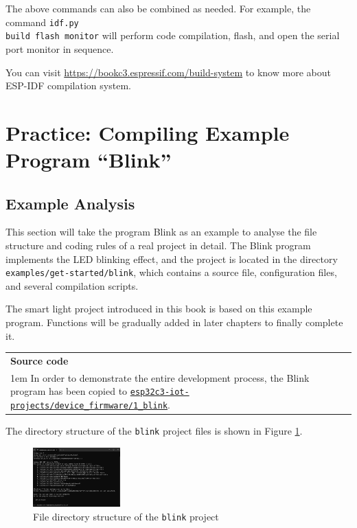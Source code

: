 \documentclass[a4paper,12pt,openany]{book}
\newcommand{\note}[2][NOTE]{ %
\vspace{6pt}
\begin{tabular}{b{\textwidth}}
\hline
\fontfamily{phv}\selectfont \textbf{#1}\\
\leftskip 1em #2\\
\hline
\end{tabular}
}
\begin{document}
The above commands can also be combined as needed. For example, the command \verb|idf.py |\\ \verb|build flash monitor| will perform code compilation, flash, and open the serial port monitor in sequence.

You can visit \url{https://bookc3.espressif.com/build-system} to know more about ESP-IDF compilation system.

\section{Practice: Compiling Example Program “Blink”}
\subsection{Example Analysis}
This section will take the program Blink as an example to analyse the file structure and coding rules of a real project in detail. The Blink program implements the LED blinking effect, and the project is located in the directory \verb|examples/get-started/blink|, which contains a source file, configuration files, and several compilation scripts.

The smart light project introduced in this book is based on this example program. Functions will be gradually added in later chapters to finally complete it.

\note[Source code]{In order to demonstrate the entire development process, the Blink program has been copied to \href{https://github.com/espressif/book-esp32c3-iot-projects/tree/main/device_firmware/1_blink}{\texttt{esp32c3-iot-projects/device\_firmware/1\_blink}}.}

The directory structure of the \verb|blink| project files is shown in Figure \ref{File directory structure of the blink project}.

\begin{figure}[h!]
    \centering
    \includegraphics[width=0.3\textwidth]{D4Z/4-16}
    \caption{File directory structure of the \texttt{blink} project}
    \label{File directory structure of the blink project}
\end{figure}
\end{document}
